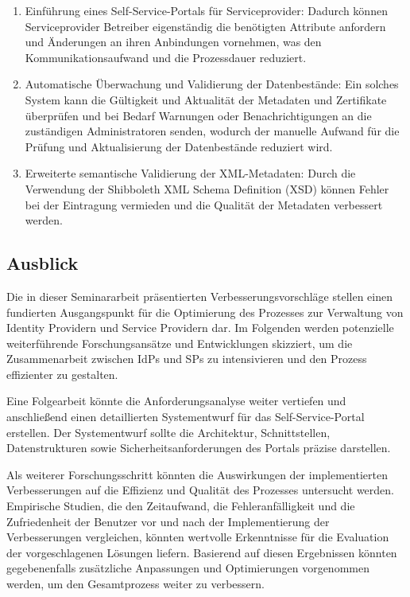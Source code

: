 \begin{enumerate}
    \item Einführung eines Self-Service-Portals für Serviceprovider: Dadurch können Serviceprovider Betreiber eigenständig die benötigten Attribute anfordern und Änderungen an ihren Anbindungen vornehmen, was den Kommunikationsaufwand und die Prozessdauer reduziert.
    \item Automatische Überwachung und Validierung der Datenbestände: Ein solches System kann die Gültigkeit und Aktualität der Metadaten und Zertifikate überprüfen und bei Bedarf Warnungen oder Benachrichtigungen an die zuständigen Administratoren senden, wodurch der manuelle Aufwand für die Prüfung und Aktualisierung der Datenbestände reduziert wird.
    \item Erweiterte semantische Validierung der XML-Metadaten: Durch die Verwendung der Shibboleth XML Schema Definition (XSD) können Fehler bei der Eintragung vermieden und die Qualität der Metadaten verbessert werden.
\end{enumerate}

\subsection{Ausblick}\label{subsec:outlook}
Die in dieser Seminararbeit präsentierten Verbesserungsvorschläge stellen einen fundierten Ausgangspunkt für die Optimierung des Prozesses zur Verwaltung von Identity Providern und Service Providern dar.
Im Folgenden werden potenzielle weiterführende Forschungsansätze und Entwicklungen skizziert, um die Zusammenarbeit zwischen IdPs und SPs zu intensivieren und den Prozess effizienter zu gestalten.

Eine Folgearbeit könnte die Anforderungsanalyse weiter vertiefen und anschließend einen detaillierten Systementwurf für das Self-Service-Portal erstellen.
Der Systementwurf sollte die Architektur, Schnittstellen, Datenstrukturen sowie Sicherheitsanforderungen des Portals präzise darstellen.

Als weiterer Forschungsschritt könnten die Auswirkungen der implementierten Verbesserungen auf die Effizienz und Qualität des Prozesses untersucht werden.
Empirische Studien, die den Zeitaufwand, die Fehleranfälligkeit und die Zufriedenheit der Benutzer vor und nach der Implementierung der Verbesserungen vergleichen, könnten wertvolle Erkenntnisse für die Evaluation der vorgeschlagenen Lösungen liefern.
Basierend auf diesen Ergebnissen könnten gegebenenfalls zusätzliche Anpassungen und Optimierungen vorgenommen werden, um den Gesamtprozess weiter zu verbessern.
